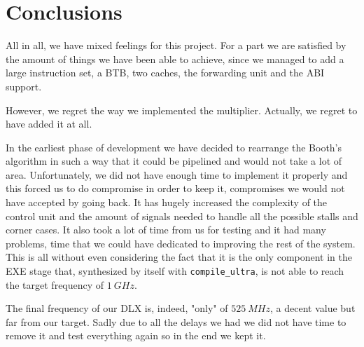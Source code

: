 \chapter{Conclusions}
\label{chap:conclusions}

All in all, we have mixed feelings for this project. For a part we are satisfied by the amount of things we have been able to achieve,
since we managed to add a large instruction set, a BTB, two caches, the forwarding unit and the ABI support.

However, we regret the way we implemented the multiplier. Actually, we regret to have added it at all.

In the earliest phase
of development we have decided to rearrange the Booth's algorithm in such a way that it could be pipelined and would not take a lot of area.
Unfortunately, we did not have enough time to implement it properly and this forced us to do compromise in order to keep it, compromises we
would not have accepted by going back. It has hugely increased the complexity of the control unit and the amount of signals needed to handle
all the possible stalls and corner cases. It also took a lot of time from us for testing and it had many problems, time that we could have
dedicated to improving the rest of the system. This is all without even considering the fact that it is the only component in the EXE stage that,
synthesized by itself with \verb|compile_ultra|, is not able to reach the target frequency of $1\ GHz$.

The final frequency of our DLX is, indeed, "only" of $525\ MHz$, a decent value but far from our target. Sadly due to all the delays we had
we did not have time to remove it and test everything again so in the end we kept it.